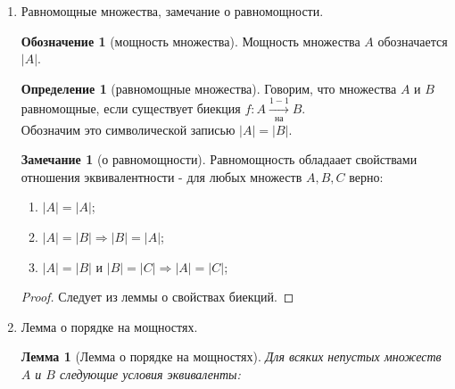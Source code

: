 \documentclass[a4paper]{article}
\newtheorem*{lemma*}{Лемма}
\theoremstyle{definition}
\newtheorem*{definition*}{Определение}
\newtheorem*{name}{Обозначение}
\newtheorem*{paradoks}{Парадокс}
\newtheorem*{comment*}{Замечание}
\begin{document}
\begin{enumerate}
\begin{paradoks}[Парадокс Рассела]
        Предположим, что само $M_{R}$ является множеством. Возможны два варианта:\\
        \begin{enumerate}
         \item $M_{R} \notin{M_{R}}$. Тогда $A - M_{R}$ подходит под определние, и $M_{R} \notin{M_{R}}$. Противоречие.
         \item $M_{R} \in{M_{R}}$. Вновь полагая, $A = M_{R}$, получаем, что по определению $M_{R} \notin{M_{R}}$. Противоречие.
        \end{enumerate}
        Это рассуждение показывает, что совокупность $M_{R}$ нельзя считать множеством.
       \end{paradoks}
       Аксиоматика ZFC.\\
       Можно с собой на листочке!!!
 \item Равномощные множества, замечание о равномощности.
       \begin{name}[мощность множества]
        Мощность множества $A$ обозначается $|A|$.
       \end{name}
       \begin{definition*}[равномощные множества]
        Говорим, что множества $A$ и $B$ равномощные, если существует биекция $f: A \xrightarrow[ \text{на}]{1-1} B$. \\
        Обозначим это символической записью $|A| = |B|$.
       \end{definition*}
       \begin{comment*}[о равномощности]
        Равномощность обладаает свойствами отношения эквивалентности - для любых множеств $A, B, C$ верно:
        \begin{enumerate}
         \item $|A| = |A|$;
         \item $|A| = |B| \Rightarrow |B| = |A|$;
         \item $|A| = |B|$ и $|B| = |C| \Rightarrow |A| = |C|$;
        \end{enumerate}
       \end{comment*}
       \begin{proof}
        Следует из леммы о свойствах биекций.
       \end{proof}
 \item Лемма о порядке на мощностях.
       \begin{lemma*}[Лемма о порядке на мощностях]
        Для всяких непустых множеств $A$ и $B$ следующие условия эквиваленты:
        \begin{enumerate}

\end{enumerate}
\end{lemma*}
\end{enumerate}
\end{document}
